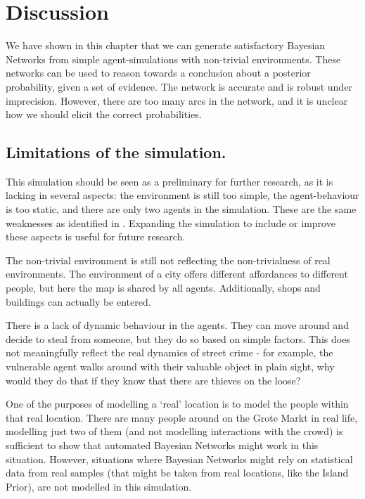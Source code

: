 \section{Discussion}

We have shown in this chapter that we can generate satisfactory Bayesian Networks from simple agent-simulations with non-trivial environments. These networks can be used to reason towards a conclusion about a posterior probability, given a set of evidence. The network is accurate and is robust under imprecision. However, there are too many arcs in the network, and it is unclear how we should elicit the correct probabilities.

\subsection{Limitations of the simulation.}
This simulation should be seen as a preliminary for further research, as it is lacking in several aspects: the environment is still too simple, the agent-behaviour is too static, and there are only two agents in the simulation. These are the same weaknesses as identified in \citep{Zhu2021}. Expanding the simulation to include or improve these aspects is useful for future research.

The non-trivial environment is still not reflecting the non-trivialness of real environments. The environment of a city offers different affordances to different people, but here the map is shared by all agents. Additionally, shops and buildings can actually be entered.

There is a lack of dynamic behaviour in the agents. They can move around and decide to steal from someone, but they do so based on simple factors. This does not meaningfully reflect the real dynamics of street crime - for example, the vulnerable agent walks around with their valuable object in plain sight, why would they do that if they know that there are thieves on the loose?

One of the purposes of modelling a `real' location is to model the people within that real location. There are many people around on the Grote Markt in real life, modelling just two of them (and not modelling interactions with the crowd) is sufficient to show that automated Bayesian Networks might work in this situation. However, situations where Bayesian Networks might rely on statistical data from real samples (that might be taken from real locations, like the Island Prior), are not modelled in this simulation. 

